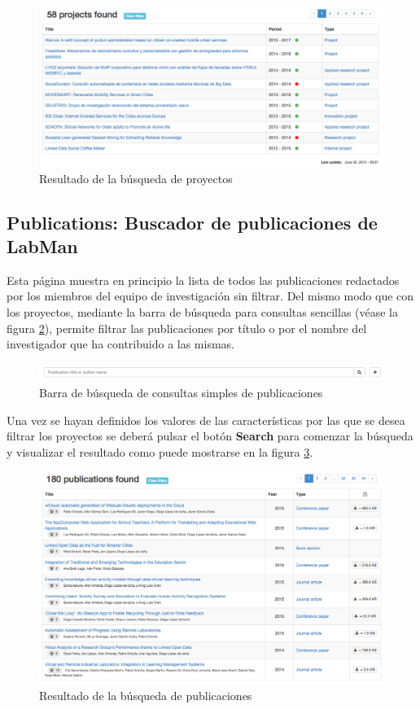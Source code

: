 \begin{figure}[!htbp]
	\centering
	\includegraphics[scale=0.31]{fig/projects_search_result}
	\caption{Resultado de la búsqueda de proyectos}
	\label{fig:projects_search_result}
\end{figure}

\subsection{Publications: Buscador de publicaciones de LabMan}

Esta página muestra en principio la lista de todos las publicaciones redactados por los miembros del equipo de investigación sin filtrar. Del mismo modo que con los proyectos, mediante la barra de búsqueda para consultas sencillas (véase la figura \ref{fig:publication_search_bar}), permite filtrar las publicaciones por título o por el nombre del investigador que ha contribuido a las mismas.

\begin{figure}[!htbp]
	\centering
	\includegraphics[scale=0.35]{fig/publication_search_bar}
	\caption{Barra de búsqueda de consultas simples de publicaciones}
	\label{fig:publication_search_bar}
\end{figure}

Una vez se hayan definidos los valores de las características por las que se desea filtrar los proyectos se deberá pulsar el botón \textbf{Search} para comenzar la búsqueda y visualizar el resultado como puede mostrarse en la figura \ref{fig:publications_search_result}.

\begin{figure}[!htbp]
	\centering
	\includegraphics[scale=0.31]{fig/publications_search_result}
	\caption{Resultado de la búsqueda de publicaciones}
	\label{fig:publications_search_result}
\end{figure}
